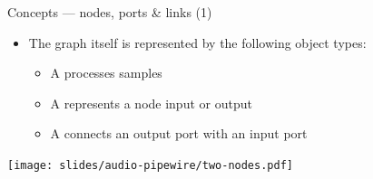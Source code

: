\begin{frame}{Concepts — nodes, ports \& links (1)}
  \begin{itemize}

  \item The graph itself is represented by the following object types:

    \begin{itemize}
    \item A  processes samples
    \item A  represents a node input or output
    \item A  connects an output port with an input port
    \end{itemize}

  \end{itemize}

  \begin{center}
    \texttt{[image: slides/audio-pipewire/two-nodes.pdf]}\\
  \end{center}
\end{frame}



